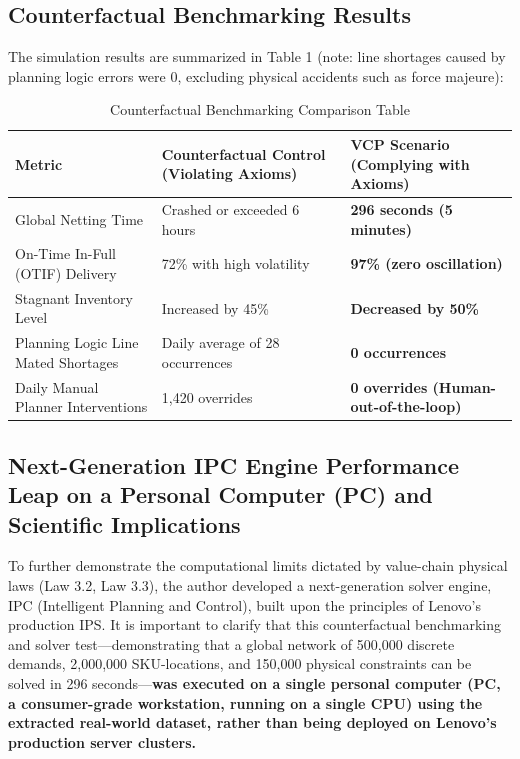 \documentclass[11pt,a4paper]{article}
\begin{document}
\subsection{Counterfactual Benchmarking Results}
The simulation results are summarized in Table 1 (note: line shortages caused by planning logic errors were 0, excluding physical accidents such as force majeure):

\begin{table}[htbp]
\centering
\caption{Counterfactual Benchmarking Comparison Table}
\label{tab:counterfactual}
\begin{tabular}{p{4cm}p{5cm}p{5cm}}
\toprule
\textbf{Metric} & \textbf{Counterfactual Control (Violating Axioms)} & \textbf{VCP Scenario (Complying with Axioms)} \\
\midrule
Global Netting Time & Crashed or exceeded 6 hours & \textbf{296 seconds (5 minutes)} \\
\midrule
On-Time In-Full (OTIF) Delivery & 72\% with high volatility & \textbf{97\% (zero oscillation)} \\
\midrule
Stagnant Inventory Level & Increased by 45\% & \textbf{Decreased by 50\%} \\
\midrule
Planning Logic Line Mated Shortages & Daily average of 28 occurrences & \textbf{0 occurrences} \\
\midrule
Daily Manual Planner Interventions & 1,420 overrides & \textbf{0 overrides (Human-out-of-the-loop)} \\
\bottomrule
\end{tabular}
\end{table}

\subsection{Next-Generation IPC Engine Performance Leap on a Personal Computer (PC) and Scientific Implications}
To further demonstrate the computational limits dictated by value-chain physical laws (Law 3.2, Law 3.3), the author developed a next-generation solver engine, IPC (Intelligent Planning and Control), built upon the principles of Lenovo's production IPS. It is important to clarify that this counterfactual benchmarking and solver test—demonstrating that a global network of 500,000 discrete demands, 2,000,000 SKU-locations, and 150,000 physical constraints can be solved in 296 seconds—\textbf{was executed on a single personal computer (PC, a consumer-grade workstation, running on a single CPU) using the extracted real-world dataset, rather than being deployed on Lenovo's production server clusters.}
\end{document}
